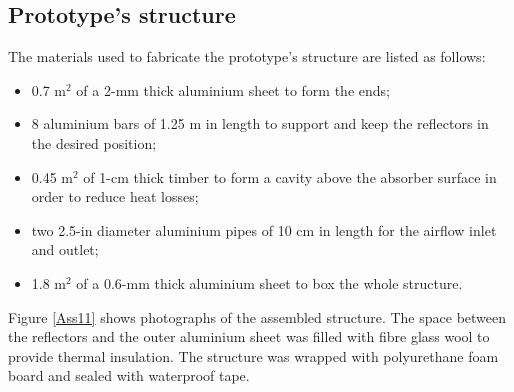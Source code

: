 \subsection{Prototype's structure}

The materials used to fabricate the prototype's structure are listed as follows:

\begin{itemize}
	\item 0.7 m$^2$ of a 2-mm thick aluminium sheet to form the ends;
	\item 8 aluminium bars of 1.25 m in length to support and keep the reflectors in the desired position;
	\item 0.45 m$^2$ of 1-cm thick timber to form a cavity above the absorber surface in order to reduce heat losses;
	\item two 2.5-in diameter aluminium pipes of 10 cm in length for the airflow inlet and outlet;
	\item 1.8 m$^2$ of a 0.6-mm thick aluminium sheet to box the whole structure.
	
\end{itemize}

Figure \ref{Ass11} shows photographs of the assembled structure. The space between the reflectors and the outer aluminium sheet was filled with fibre glass wool to provide thermal insulation. The structure was wrapped with polyurethane foam board and sealed with waterproof tape.

